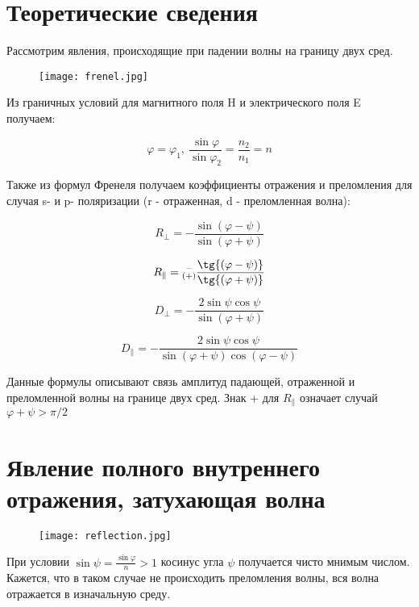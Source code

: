 	\section{Теоретические сведения}
	
	Рассмотрим явления, происходящие  при падении волны на границу двух сред. 
	
	\begin{figure}[h]
		\texttt{[image: frenel.jpg]}
	\end{figure}

	Из граничных условий для магнитного поля H и электрического поля E получаем:
	
	\[ \varphi = \varphi_{1}, \ \frac{\sin{ \varphi}} { \sin{ \varphi_{2}} } = \frac{n_{2}}{n_{1}} = n \]
	
	Также из формул Френеля получаем коэффициенты отражения и преломления для случая s- и p- поляризации (r - отраженная, d - преломленная волна):
	
	
	\[ R_{\perp} = - \frac{ \sin{(\varphi - \psi)}}{\sin{ (\varphi + \psi)}} \]
	
	\[ R_{\parallel} = \substack{ - \\ (+)} \frac{ \tg{(\varphi - \psi)}}{\tg{ (\varphi + \psi)}}  \]
	
	\[ D_{\perp} = - \frac{2  \sin{ \psi} \cos{\psi}} {\sin{ (\varphi + \psi)}} \]
	
		\[ D_{\parallel} = - \frac{2  \sin{ \psi} \cos{\psi}} {\sin{ (\varphi + \psi)} \cos(\varphi - \psi) } \]
		
	Данные формулы описывают связь амплитуд падающей, отраженной и преломленной волны на границе двух сред. Знак + для $ R_{\parallel} $ означает случай $ \varphi + \psi  > \pi / 2 $

	\section{Явление полного внутреннего отражения, затухающая волна}
	
	\begin{figure}[h]
		\texttt{[image: reflection.jpg]}
	\end{figure}

	При условии $ \sin{\psi} =  \frac{\sin{\varphi}}{n} > 1$ косинус угла
	$ \psi $ получается чисто мнимым числом. Кажется, что в таком случае не происходить преломления волны, вся волна отражается в изначальную среду.
	
